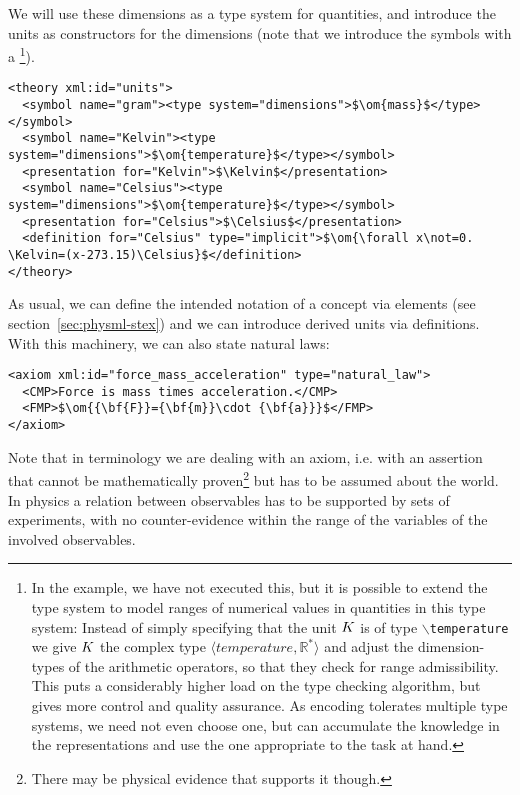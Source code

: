 We will use these dimensions as a type system for quantities, and introduce the units as
constructors for the dimensions (note that we introduce the symbols with a
{}\footnote{In the example, we have not executed this, but it is possible
  to extend the type system to model ranges of numerical values in quantities in this type
  system: Instead of simply specifying that the unit $K$ is of type
  {\tt{$\backslash$temperature}} we give $K$ the complex type $\langle
  temperature,{\mathbb{R}}^*\rangle$ and adjust the dimension-types of the arithmetic
  operators, so that they check for range admissibility. This puts a considerably higher
  load on the type checking algorithm, but gives more control and quality assurance. As
  {\omdoc} encoding tolerates multiple type systems, we need not even choose one, but
  can accumulate the knowledge in the representations and use the one appropriate to the
  task at hand.}).
\begin{lstlisting}[label=lst:units,mathescape,caption={A Theory of SI Units},
  index={theory,symbol}]
<theory xml:id="units">
  <symbol name="gram"><type system="dimensions">$\om{mass}$</type></symbol>      
  <symbol name="Kelvin"><type system="dimensions">$\om{temperature}$</type></symbol>
  <presentation for="Kelvin">$\Kelvin$</presentation>
  <symbol name="Celsius"><type system="dimensions">$\om{temperature}$</type></symbol>
  <presentation for="Celsius">$\Celsius$</presentation>
  <definition for="Celsius" type="implicit">$\om{\forall x\not=0. \Kelvin=(x-273.15)\Celsius}$</definition>
</theory>
\end{lstlisting}
As usual, we can define the intended notation of a concept via {}
elements (see section~\ref{sec:physml-stex}) and we can introduce derived units via
definitions. With this machinery, we can also state natural laws:
\begin{lstlisting}[label=lst:nat_law,mathescape,
  caption={A Natural Law Expressed as an {\omdoc} {\element{axiom}}.},
  index={axiom}]
<axiom xml:id="force_mass_acceleration" type="natural_law">
  <CMP>Force is mass times acceleration.</CMP>
  <FMP>$\om{{\bf{F}}={\bf{m}}\cdot {\bf{a}}}$</FMP>
</axiom>
\end{lstlisting}
Note that in {\omdoc} terminology we are dealing with an axiom, i.e. with an assertion
that cannot be mathematically proven\footnote{There may be physical evidence that supports
  it though.} but has to be assumed about the world.  In physics a relation between
observables has to be supported by sets of experiments, with no counter-evidence within the
range of the variables of the involved observables.

